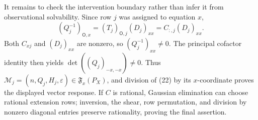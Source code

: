 It remains to check the intervention boundary rather than infer it from observational solvability. Since row \(j\) was assigned to equation \(x\),
\[
 (Q_j^{-1})_{\mathsf O,x}
 =(T_j)_{\mathsf O,j}(D_j)_{xx}
 =C_{:,j}(D_j)_{xx}. \tag{22}
\]
Both \(C_{xj}\) and \((D_j)_{xx}\) are nonzero, so \((Q_j^{-1})_{xx}\ne0\). The principal cofactor identity then yields \(\det((Q_j)_{-x,-x})\ne0\). Thus \(\mathcal M_j=(n,Q_j,H_j,\varepsilon)\in\mathfrak F_x(P_X)\), and division of (22) by its \(x\)-coordinate proves the displayed vector response. If \(C\) is rational, Gaussian elimination can choose rational extension rows; inversion, the shear, row permutation, and division by nonzero diagonal entries preserve rationality, proving the final assertion.